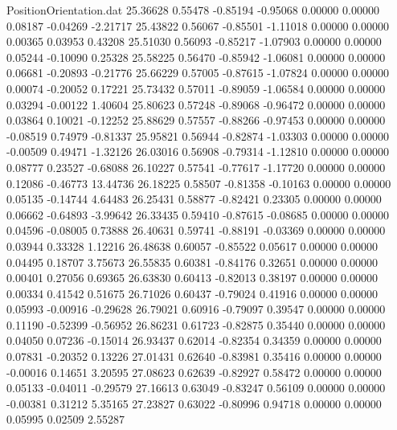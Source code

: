 \begin{filecontents}{PositionOrientation.dat}
  25.36628    0.55478   -0.85194    -0.95068    0.00000    0.00000    0.08187   -0.04269   -2.21717
  25.43822    0.56067   -0.85501    -1.11018    0.00000    0.00000    0.00365    0.03953    0.43208
  25.51030    0.56093   -0.85217    -1.07903    0.00000    0.00000    0.05244   -0.10090    0.25328
  25.58225    0.56470   -0.85942    -1.06081    0.00000    0.00000    0.06681   -0.20893   -0.21776
  25.66229    0.57005   -0.87615    -1.07824    0.00000    0.00000    0.00074   -0.20052    0.17221
  25.73432    0.57011   -0.89059    -1.06584    0.00000    0.00000    0.03294   -0.00122    1.40604
  25.80623    0.57248   -0.89068    -0.96472    0.00000    0.00000    0.03864    0.10021   -0.12252
  25.88629    0.57557   -0.88266    -0.97453    0.00000    0.00000   -0.08519    0.74979   -0.81337
  25.95821    0.56944   -0.82874    -1.03303    0.00000    0.00000   -0.00509    0.49471   -1.32126
  26.03016    0.56908   -0.79314    -1.12810    0.00000    0.00000    0.08777    0.23527   -0.68088
  26.10227    0.57541   -0.77617    -1.17720    0.00000    0.00000    0.12086   -0.46773   13.44736
  26.18225    0.58507   -0.81358    -0.10163    0.00000    0.00000    0.05135   -0.14744    4.64483
  26.25431    0.58877   -0.82421     0.23305    0.00000    0.00000    0.06662   -0.64893   -3.99642
  26.33435    0.59410   -0.87615    -0.08685    0.00000    0.00000    0.04596   -0.08005    0.73888
  26.40631    0.59741   -0.88191    -0.03369    0.00000    0.00000    0.03944    0.33328    1.12216
  26.48638    0.60057   -0.85522     0.05617    0.00000    0.00000    0.04495    0.18707    3.75673
  26.55835    0.60381   -0.84176     0.32651    0.00000    0.00000    0.00401    0.27056    0.69365
  26.63830    0.60413   -0.82013     0.38197    0.00000    0.00000    0.00334    0.41542    0.51675
  26.71026    0.60437   -0.79024     0.41916    0.00000    0.00000    0.05993   -0.00916   -0.29628
  26.79021    0.60916   -0.79097     0.39547    0.00000    0.00000    0.11190   -0.52399   -0.56952
  26.86231    0.61723   -0.82875     0.35440    0.00000    0.00000    0.04050    0.07236   -0.15014
  26.93437    0.62014   -0.82354     0.34359    0.00000    0.00000    0.07831   -0.20352    0.13226
  27.01431    0.62640   -0.83981     0.35416    0.00000    0.00000   -0.00016    0.14651    3.20595
  27.08623    0.62639   -0.82927     0.58472    0.00000    0.00000    0.05133   -0.04011   -0.29579
  27.16613    0.63049   -0.83247     0.56109    0.00000    0.00000   -0.00381    0.31212    5.35165
  27.23827    0.63022   -0.80996     0.94718    0.00000    0.00000    0.05995    0.02509    2.55287

\end{filecontents}
